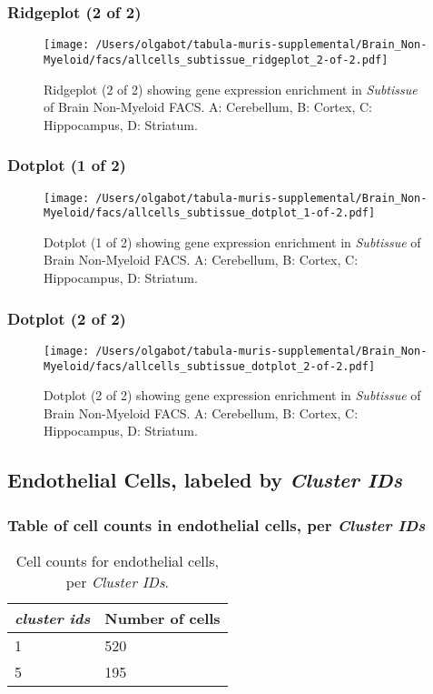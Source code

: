 \clearpage
\subsubsection{Ridgeplot (2 of 2)}
\begin{figure}[h]
\centering
\texttt{[image: /Users/olgabot/tabula-muris-supplemental/Brain\_Non-Myeloid/facs/allcells\_subtissue\_ridgeplot\_2-of-2.pdf]}

\caption{ Ridgeplot (2 of 2)  showing gene expression enrichment in \emph{Subtissue} of Brain Non-Myeloid FACS. A: Cerebellum, B: Cortex, C: Hippocampus, D: Striatum.}
\end{figure}


\clearpage
\subsubsection{Dotplot (1 of 2)}
\begin{figure}[h]
\centering
\texttt{[image: /Users/olgabot/tabula-muris-supplemental/Brain\_Non-Myeloid/facs/allcells\_subtissue\_dotplot\_1-of-2.pdf]}

\caption{ Dotplot (1 of 2)  showing gene expression enrichment in \emph{Subtissue} of Brain Non-Myeloid FACS. A: Cerebellum, B: Cortex, C: Hippocampus, D: Striatum.}
\end{figure}


\clearpage
\subsubsection{Dotplot (2 of 2)}
\begin{figure}[h]
\centering
\texttt{[image: /Users/olgabot/tabula-muris-supplemental/Brain\_Non-Myeloid/facs/allcells\_subtissue\_dotplot\_2-of-2.pdf]}

\caption{ Dotplot (2 of 2)  showing gene expression enrichment in \emph{Subtissue} of Brain Non-Myeloid FACS. A: Cerebellum, B: Cortex, C: Hippocampus, D: Striatum.}
\end{figure}


\clearpage
\subsection{Endothelial Cells, labeled by \emph{Cluster IDs}}
\subsubsection{Table of cell counts in endothelial cells, per \emph{Cluster IDs}}\begin{table}[h]
\centering
\label{my-label}
\begin{tabular}{@{}ll@{}}
\toprule

\emph{cluster ids}& Number of cells \\ \midrule
1 & 520 \\

5 & 195 \\
\bottomrule
\end{tabular}
\caption{Cell counts for endothelial cells, per \emph{Cluster IDs}.}
\end{table}

